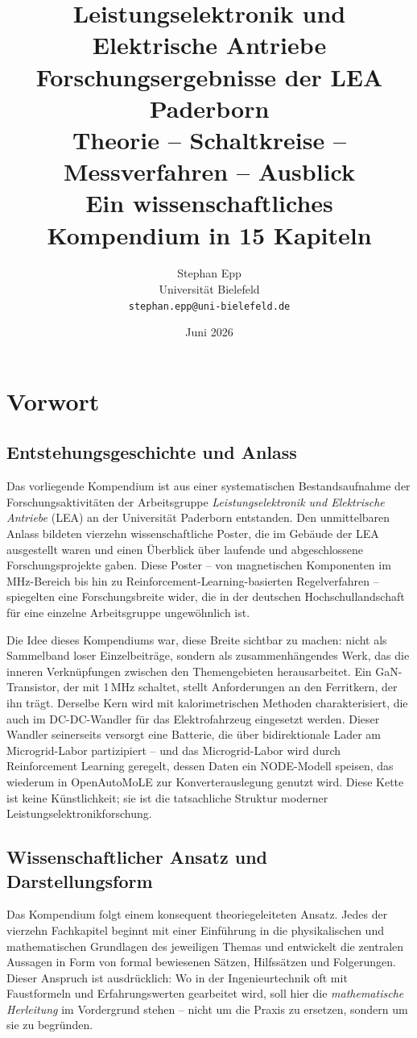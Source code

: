 ﻿\documentclass[a4paper,12pt,openany,oneside]{book}
\title{%
  {\Huge\bfseries\color{black}Leistungselektronik und Elektrische Antriebe}\\[1em]
  {\Large Forschungsergebnisse der LEA Paderborn\\[0.4em]
  Theorie -- Schaltkreise -- Messverfahren -- Ausblick}\\[2em]
  {\large\color{dunkelgrau}Ein wissenschaftliches Kompendium in 15 Kapiteln}
}
\author{Stephan Epp\\[0.5em]
  \small Universit\"at Bielefeld\\
  \small\texttt{stephan.epp@uni-bielefeld.de}
}
\date{Juni 2026}
\newcommand{\abschnitt}[1]{\section{#1}}
\theoremstyle{definition}
\begin{document}
\sloppy

\maketitle
\tableofcontents
\newpage

\chapter{Vorwort}

\abschnitt{Entstehungsgeschichte und Anlass}

Das vorliegende Kompendium ist aus einer systematischen Bestandsaufnahme der
Forschungsaktivit\"aten der Arbeitsgruppe \emph{Leistungselektronik und Elektrische
Antriebe} (LEA) an der Universit\"at Paderborn entstanden. Den unmittelbaren Anlass
bildeten vierzehn wissenschaftliche Poster, die im Geb\"aude der LEA ausgestellt waren
und einen \"Uberblick \"uber laufende und abgeschlossene Forschungsprojekte gaben. Diese
Poster -- von magnetischen Komponenten im MHz-Bereich bis hin zu Reinforcement-Learning-basierten
Regelverfahren -- spiegelten eine Forschungsbreite wider, die in der deutschen Hochschullandschaft
f\"ur eine einzelne Arbeitsgruppe ungew\"ohnlich ist.

Die Idee dieses Kompendiums war, diese Breite sichtbar zu machen: nicht als
Sammelband loser Einzelbeitr\"age, sondern als zusammenh\"angendes Werk, das die inneren
Verkn\"upfungen zwischen den Themengebieten herausarbeitet. Ein GaN-Transistor, der mit
1\,MHz schaltet, stellt Anforderungen an den Ferritkern, der ihn tr\"agt. Derselbe Kern
wird mit kalorimetrischen Methoden charakterisiert, die auch im DC-DC-Wandler f\"ur das
Elektrofahrzeug eingesetzt werden. Dieser Wandler seinerseits versorgt eine Batterie, die
\"uber bidirektionale Lader am Microgrid-Labor partizipiert -- und das Microgrid-Labor
wird durch Reinforcement Learning geregelt, dessen Daten ein NODE-Modell speisen,
das wiederum in OpenAutoMoLE zur Konverterauslegung genutzt wird. Diese Kette ist keine
K\"unstlichkeit; sie ist die tatsa\-chliche Struktur moderner Leistungselektronikforschung.

\abschnitt{Wissenschaftlicher Ansatz und Darstellungsform}

Das Kompendium folgt einem konsequent theoriegeleiteten Ansatz. Jedes der vierzehn
Fachkapitel beginnt mit einer Einf\"uhrung in die physikalischen und mathematischen
Grundlagen des jeweiligen Themas und entwickelt die zentralen Aussagen in Form von
formal bewiesenen S\"atzen, Hilfss\"atzen und Folgerungen. Dieser Anspruch ist
ausdr\"ucklich: Wo in der Ingenieurtechnik oft mit Faustformeln und Erfahrungswerten
gearbeitet wird, soll hier die \emph{mathematische Herleitung} im Vordergrund stehen --
nicht um die Praxis zu ersetzen, sondern um sie zu begr\"unden.
\end{document}
